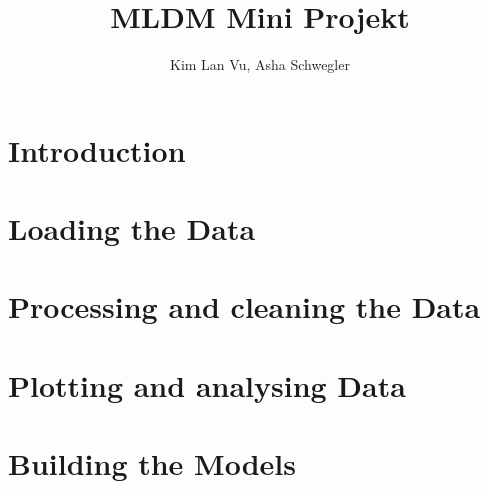 \documentclass{article}
\title{MLDM Mini Projekt}
\author{Kim Lan Vu, Asha Schwegler}
\begin{document}
\maketitle
\tableofcontents
\newpage


\section{Introduction}


\section{Loading the Data}


\section{Processing and cleaning the Data}


\section{Plotting and analysing Data}


\section{Building the Models}

\end{document}
